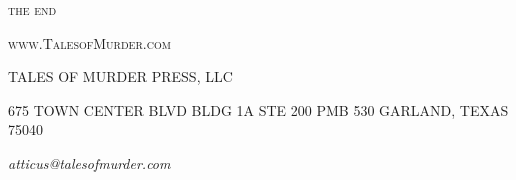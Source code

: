 \documentclass{novel}
\begin{document}
\scenebreak
\scenebreak
{\centering\textsc{the end}\par}

\clearpage

\null

\centering\textsc{www.TalesofMurder.com}\par

\vspace*{10\nbs}


TALES OF MURDER PRESS, LLC

\null

\scshape{675 TOWN CENTER BLVD
BLDG 1A STE 200 PMB 530
GARLAND, TEXAS 75040}

\null

\textit{atticus@talesofmurder.com}
\vfill
\end{document}
